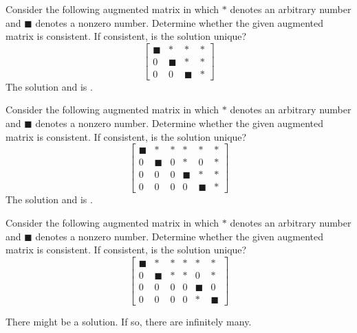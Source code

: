 \documentclass{ximera}
\begin{document}
\begin{problem}\label{prb:2.5}
Consider the following augmented matrix in which $\ast $ denotes an arbitrary
number and $\blacksquare $ denotes a nonzero number. Determine whether the
given augmented matrix is consistent. If consistent, is the solution unique?
\begin{equation*}
\left[
\begin{array}{ccc|c}
\blacksquare & \ast & \ast & \ast \\
0 & \blacksquare & \ast & \ast \\
0 & 0 & \blacksquare & \ast
\end{array}
\right]
\end{equation*}
The solution  and is .
\end{problem}


\begin{problem}\label{prb:2.6}
Consider the following augmented matrix in which $\ast $ denotes an arbitrary
number and $\blacksquare $ denotes a nonzero number. Determine whether the
given augmented matrix is consistent. If consistent, is the solution unique?
\begin{equation*}
\left[
\begin{array}{ccccc|c}
\blacksquare & \ast & \ast & \ast & \ast & \ast \\
0 & \blacksquare & 0 & \ast & 0 & \ast \\
0 & 0 & 0 & \blacksquare & \ast & \ast \\
0 & 0 & 0 & 0 & \blacksquare & \ast
\end{array}
\right]
\end{equation*}
The solution  and is .
\end{problem}

\begin{problem}\label{prb:2.7}
Consider the following augmented matrix in which $\ast $ denotes an arbitrary
number and $\blacksquare $ denotes a nonzero number. Determine whether the
given augmented matrix is consistent. If consistent, is the solution unique?
\begin{equation*}
\left[
\begin{array}{ccccc|c}
\blacksquare & \ast & \ast & \ast & \ast & \ast \\
0 & \blacksquare & \ast & \ast & 0 & \ast \\
0 & 0 & 0 & 0 & \blacksquare & 0 \\
0 & 0 & 0 & 0 & \ast & \blacksquare
\end{array}
\right]
\end{equation*}
\begin{hint}
There might be a solution. If so, there are infinitely many.
\end{hint}
\end{problem}
\end{document}
